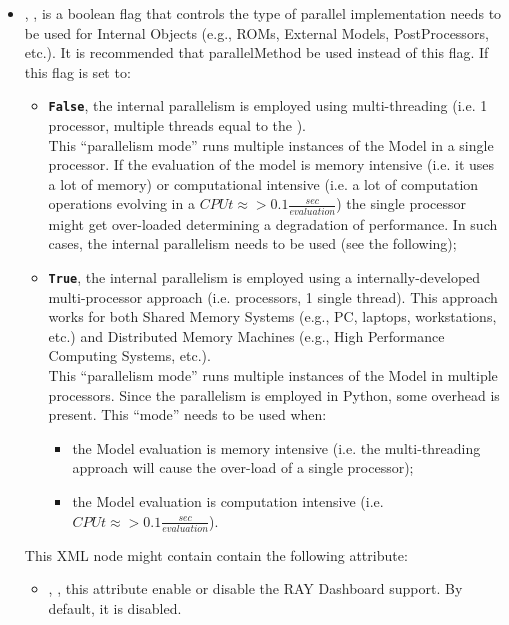 \begin{itemize}
\item {}, , is a boolean
flag that controls the type of parallel implementation needs to be used for Internal
Objects (e.g., ROMs, External Models, PostProcessors, etc.).  It is recommended that parallelMethod be used instead of this flag.
If this flag is set to:
\begin{itemize}
 \item  \textbf{\texttt{False}}, the internal parallelism is employed using multi-threading
 (i.e. 1 processor, multiple threads equal to the ).
 \\\nb This ``parallelism mode'' runs multiple instances of the Model in a single processor.
 If the evaluation of the model is memory intensive (i.e. it uses a lot of memory) or computational
 intensive (i.e. a lot of computation operations evolving in a $CPUt  \approx >  0.1\frac{sec}{evaluation}$)
 the single processor might get over-loaded determining a degradation of performance. In such cases, the internal
 parallelism needs to be used (see the following);
 \item  \textbf{\texttt{True}}, the internal parallelism is employed using a internally-developed multi-processor
 approach (i.e.  processors, 1 single thread). This approach works for both Shared Memory Systems
 (e.g., PC, laptops, workstations, etc.) and Distributed Memory Machines (e.g., High Performance Computing Systems, etc.).
 \\\nb This ``parallelism mode'' runs multiple instances of the Model in multiple processors. Since the parallelism is employed
 in Python, some overhead is present. This ``mode'' needs to be used when:
 \begin{itemize}
  \item the Model evaluation is memory intensive (i.e. the multi-threading approach will cause the over-load of a single processor);
  \item the Model evaluation is computation intensive (i.e. $CPUt  \approx >  0.1\frac{sec}{evaluation}$).
 \end{itemize}
\end{itemize}
%
  This XML node might contain contain the following attribute:
  \vspace{-5mm}
  \begin{itemize}
    \itemsep0em
    \item {}, , this
    attribute enable or disable the RAY Dashboard support. By default,
    it is disabled.
  \end{itemize}
%


\end{itemize}
